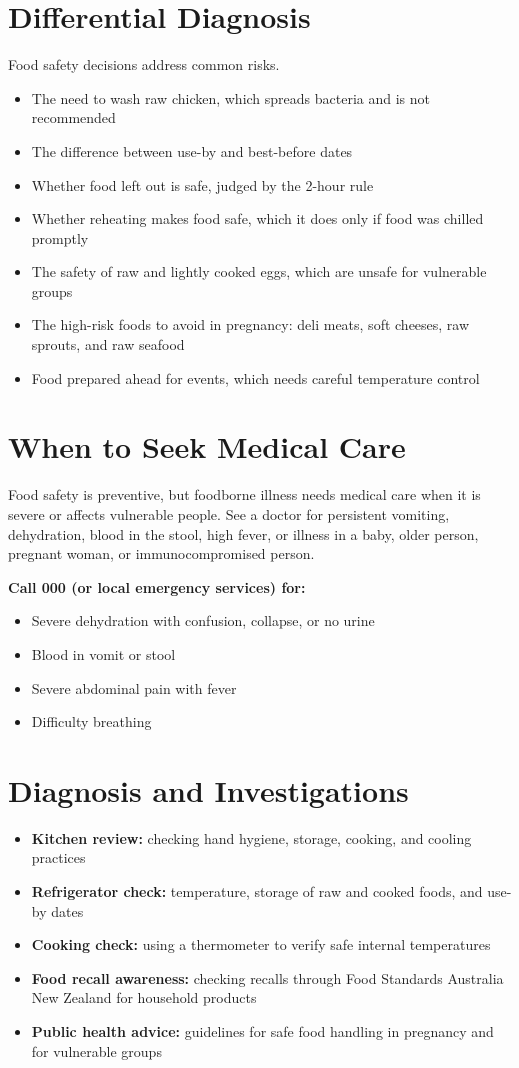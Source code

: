 \section*{Differential Diagnosis}
Food safety decisions address common risks.
\begin{itemize}
    \item The need to wash raw chicken, which spreads bacteria and is not recommended
    \item The difference between use-by and best-before dates
    \item Whether food left out is safe, judged by the 2-hour rule
    \item Whether reheating makes food safe, which it does only if food was chilled promptly
    \item The safety of raw and lightly cooked eggs, which are unsafe for vulnerable groups
    \item The high-risk foods to avoid in pregnancy: deli meats, soft cheeses, raw sprouts, and raw seafood
    \item Food prepared ahead for events, which needs careful temperature control
\end{itemize}

\section*{When to Seek Medical Care}
Food safety is preventive, but foodborne illness needs medical care when it is severe or affects vulnerable people. See a doctor for persistent vomiting, dehydration, blood in the stool, high fever, or illness in a baby, older person, pregnant woman, or immunocompromised person.

\textbf{Call 000 (or local emergency services) for:}
\begin{itemize}
    \item Severe dehydration with confusion, collapse, or no urine
    \item Blood in vomit or stool
    \item Severe abdominal pain with fever
    \item Difficulty breathing
\end{itemize}

\section*{Diagnosis and Investigations}
\begin{itemize}
    \item \textbf{Kitchen review:} checking hand hygiene, storage, cooking, and cooling practices
    \item \textbf{Refrigerator check:} temperature, storage of raw and cooked foods, and use-by dates
    \item \textbf{Cooking check:} using a thermometer to verify safe internal temperatures
    \item \textbf{Food recall awareness:} checking recalls through Food Standards Australia New Zealand for household products
    \item \textbf{Public health advice:} guidelines for safe food handling in pregnancy and for vulnerable groups
\end{itemize}

